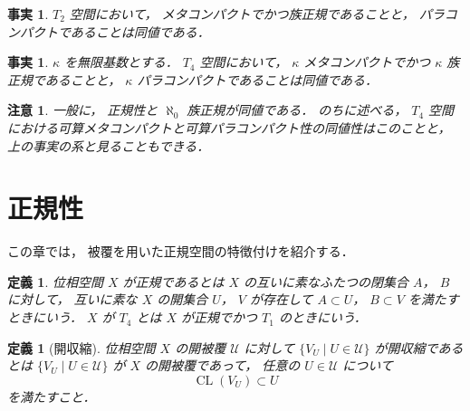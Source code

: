 \documentclass[leqno, 12pt]{ltjsarticle}
\newtheorem{df}[thm]{定義}
\newtheorem{fact}[thm]{事実}
\newtheorem*{rmk}{注意}
\DeclareMathOperator{\cl}{CL}
\begin{document}
\begin{fact}
$T_{2}$
空間において，
メタコンパクトでかつ族正規であることと，
パラコンパクトであることは同値である．
\end{fact}

\begin{fact}
$\kappa$
を無限基数とする．
$T_{4}$
空間において，
$\kappa$
メタコンパクトでかつ
$\kappa$
族正規であることと，
$\kappa$
パラコンパクトであることは同値である．
\end{fact}

\begin{rmk}
一般に，
正規性と
$\aleph_{0}$
族正規が同値である．
のちに述べる，
$T_{4}$
空間における可算メタコンパクトと可算パラコンパクト性の同値性はこのことと，
上の事実の系と見ることもできる．
\end{rmk}



\section{正規性}
この章では，
被覆を用いた正規空間の特徴付けを紹介する．


\begin{df}
位相空間
$X$
が正規であるとは
$X$
の互いに素なふたつの閉集合
$A$，
$B$
に対して，
互いに素な
$X$
の開集合
$U$，
$V$
が存在して
$A\subset U$，
$B\subset V$
を満たすときにいう．
$X$
が
$T_{4}$
とは
$X$
が正規でかつ
$T_{1}$
のときにいう．
\end{df}



\begin{df}[開収縮]
位相空間
$X$
の開被覆
$\mathcal{U}$
に対して
$\{V_{U} \mid U\in \mathcal{U}\}$
が開収縮であるとは
$\{V_{U} \mid U\in \mathcal{U}\}$
が
$X$
の開被覆であって，
任意の
$U\in \mathcal{U}$
について
\[
\cl(V_{U})\subset U
\]
を満たすこと．
\end{df}
\end{document}
